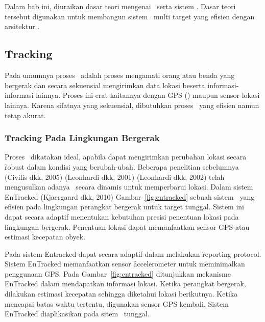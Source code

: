 
\chapter{\babDua}

Dalam bab ini, diuraikan dasar teori mengenai \tracking~serta sistem \pubsub.
Dasar teori tersebut digunakan untuk membangun sistem \tracking~multi target
yang efisien dengan arsitektur \pubsub.

\section{\f{Tracking}}

Pada umumnya proses \tracking~adalah proses mengamati orang atau benda yang
bergerak dan secara sekuensial mengirimkan data lokasi beserta
informasi-informasi lainnya.  Proses ini erat kaitannya dengan GPS (\GPS)
maupun sensor lokasi lainnya. Karena sifatnya yang sekuensial, dibutuhkan
proses \tracking~yang efisien namun tetap akurat.

\subsection{\f{Tracking} Pada Lingkungan Bergerak}

Proses \tracking~dikatakan ideal, apabila dapat mengirimkan perubahan lokasi
secara \f{robust} dalam kondisi yang berubah-ubah. Beberapa penelitian
sebelumnya (Civilis dkk, 2005) (Leonhardi dkk, 2001) (Leonhardi dkk, 2002) telah
mengusulkan adanya \tracking~secara dinamis untuk memperbarui lokasi. Dalam
sistem EnTracked (Kjaergaard dkk, 2010) Gambar~\ref{fig:entracked} sebuah sistem
\tracking~yang efisien pada lingkungan perangkat bergerak untuk target
tunggal. Sistem ini dapat secara adaptif menentukan kebutuhan presisi penentuan
lokasi pada lingkungan bergerak. Penentuan lokasi dapat memanfaatkan sensor GPS
atau estimasi kecepatan obyek.

Pada sistem Entracked dapat secara adaptif dalam melakukan \f{reporting
  protocol}. Sistem EnTracked memanfaatkan sensor \f{accelerometer} untuk
meminimalkan penggunaan GPS. Pada Gambar~\ref{fig:entracked} ditunjukkan
mekanisme EnTracked dalam mendapatkan informasi lokasi. Ketika perangkat
bergerak, dilakukan estimasi kecepatan sehingga diketahui lokasi berikutnya.
Ketika mencapai batas waktu tertentu, digunakan sensor GPS kembali. Sistem
EnTracked diaplikasikan pada sitem \tracking~tunggal.

